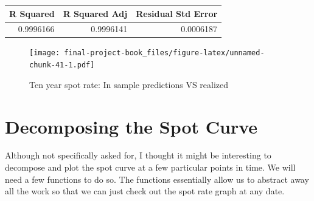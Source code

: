 \documentclass[]{book}
\newenvironment{Shaded}{\begin{snugshade}}{\end{snugshade}}
\newcommand{\ControlFlowTok}[1]{\textcolor[rgb]{0.13,0.29,0.53}{\textbf{#1}}}
\newcommand{\KeywordTok}[1]{\textcolor[rgb]{0.13,0.29,0.53}{\textbf{#1}}}
\newcommand{\NormalTok}[1]{#1}
\newcommand{\OperatorTok}[1]{\textcolor[rgb]{0.81,0.36,0.00}{\textbf{#1}}}
\newcommand{\StringTok}[1]{\textcolor[rgb]{0.31,0.60,0.02}{#1}}
\theoremstyle{definition}
\theoremstyle{definition}
\theoremstyle{definition}
\theoremstyle{remark}
\begin{document}
\begin{tabular}{r|r|r}
\hline
R Squared & R Squared Adj & Residual Std Error\\
\hline
0.9996166 & 0.9996141 & 0.0006187\\
\hline
\end{tabular}

\begin{figure}
\centering
\texttt{[image: final-project-book\_files/figure-latex/unnamed-chunk-41-1.pdf]}
\caption{\label{fig:unnamed-chunk-41}Ten year spot rate: In sample
predictions VS realized}
\end{figure}

\hypertarget{decomposing-the-spot-curve}{%
\section{Decomposing the Spot Curve}\label{decomposing-the-spot-curve}}

Although not specifically asked for, I thought it might be interesting
to decompose and plot the spot curve at a few particular points in time.
We will need a few functions to do so. The functions essentially allow
us to abstract away all the work so that we can just check out the spot
rate graph at any date.

\begin{Shaded}
\end{Shaded}
\end{document}
